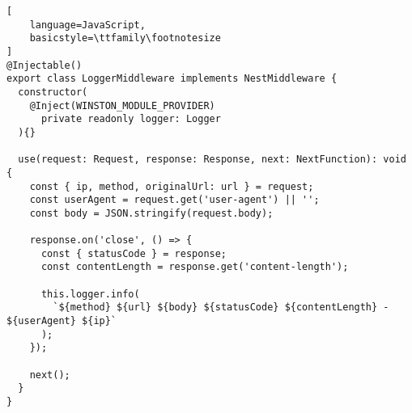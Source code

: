 \begin{lstlisting}[
    language=JavaScript,
    basicstyle=\ttfamily\footnotesize
]
@Injectable()
export class LoggerMiddleware implements NestMiddleware {
  constructor(
    @Inject(WINSTON_MODULE_PROVIDER)
      private readonly logger: Logger
  ){}

  use(request: Request, response: Response, next: NextFunction): void {
    const { ip, method, originalUrl: url } = request;
    const userAgent = request.get('user-agent') || '';
    const body = JSON.stringify(request.body);

    response.on('close', () => {
      const { statusCode } = response;
      const contentLength = response.get('content-length');

      this.logger.info(
        `${method} ${url} ${body} ${statusCode} ${contentLength} - ${userAgent} ${ip}`
      );
    });

    next();
  }
}
\end{lstlisting}

